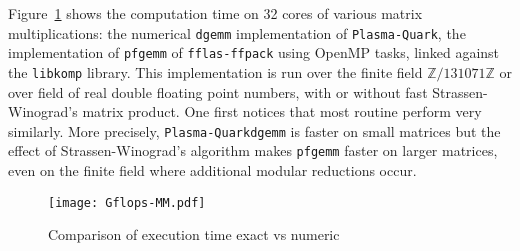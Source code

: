 \documentclass{article}
\newcommand{\pfgemm}{\texttt{pfgemm}\xspace}
\newcommand{\dgemm}{\texttt{dgemm}\xspace}
\newcommand{\libkomp}{\texttt{libkomp}\xspace}
\newcommand{\fflasffpack}{\texttt{fflas-ffpack}\xspace}
\newcommand{\plasmaquark}{\texttt{Plasma-Quark}\xspace}
\newcommand{\Z}{\ensuremath{\mathbb{Z}}\xspace}
\begin{document}
 
 
 
 
 
 

 
 
    
 
 
 
 
 
 
 
 
 
 
 
 
 
 
 
 
 

Figure~\ref{fig:pfgemmtime} shows the computation time on 32 cores of various
matrix multiplications: the numerical \dgemm implementation of \plasmaquark, 
the implementation of \pfgemm of \fflasffpack using OpenMP tasks, linked
against the \libkomp library. This implementation is run over the finite field
$\Z/131071\Z$ or over field of real double floating point numbers, with or
without fast Strassen-Winograd's matrix product. 
One first notices that most routine perform very similarly. More precisely,
\plasmaquark \dgemm is faster on small matrices but the effect of
Strassen-Winograd's algorithm makes \pfgemm faster on larger matrices, even
on the finite field where additional modular reductions occur.
 
 
 
 
 
 
 
  
 
 
 
 
 
 
 
 
 
 
 
 
 
 
\begin{figure}[ht!]
\centering
 
\texttt{[image: Gflops-MM.pdf]}\\
 
 
 
 
\caption{Comparison of execution time exact vs numeric}
\label{fig:pfgemmtime}\vspace{-5pt}
\end{figure}
 
 
 
 
 
 
 
 
 
 
 
 
 
\end{document}
